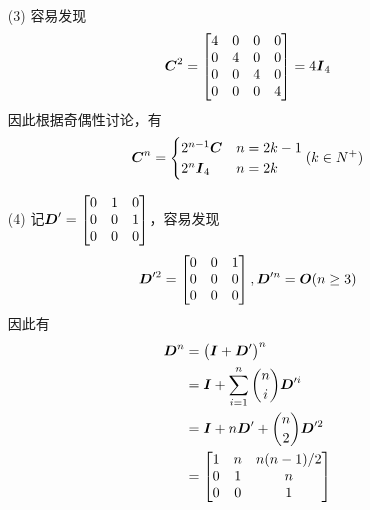 \documentclass{ctexart}
\begin{document}
\begin{problem}\

\begin{enumerate}

    \item[(3)]
        {
        容易发现
        \begin{equation*}
            \boldsymbol{C}^2=
            \begin{bmatrix}
                4 & 0 & 0 & 0 \\
                0 & 4 & 0 & 0 \\
                0 & 0 & 4 & 0 \\
                0 & 0 & 0 & 4
            \end{bmatrix}=4\boldsymbol{I}_4
        \end{equation*}
        因此根据奇偶性讨论，有
        \begin{equation*}
            \boldsymbol{C}^n=
            \begin{cases}
                2^{n-1}\boldsymbol{C} & n=2k-1 \\
                2^n\boldsymbol{I}_4   & n=2k
            \end{cases}
            (k\in N^+)
        \end{equation*}
        }

    \item[(4)]
        {
        记\(\boldsymbol{D}'=\begin{bmatrix}0&1&0\\0&0&1\\0&0&0\end{bmatrix}\)，容易发现
        \begin{equation*}
            \boldsymbol{D}'^2=\begin{bmatrix}0&0&1\\0&0&0\\0&0&0\end{bmatrix},\boldsymbol{D}'^n=\boldsymbol{O}(n\ge3)
        \end{equation*}
        因此有
        \begin{align*}
            \boldsymbol{D}^n & =\left( \boldsymbol{I}+\boldsymbol{D}' \right)^n                 \\
                    & =\boldsymbol{I}+\sum_{i=1}^n\binom{n}{i}\boldsymbol{D}'^i \\
                    & =\boldsymbol{I}+n\boldsymbol{D}'+\binom{n}{2}\boldsymbol{D}'^2     \\
                    & =\begin{bmatrix}
                           1 & n & n(n-1)/2 \\
                           0 & 1 & n        \\
                           0 & 0 & 1
                       \end{bmatrix}
        \end{align*}
        }
\end{enumerate}
\end{problem}
\end{document}
